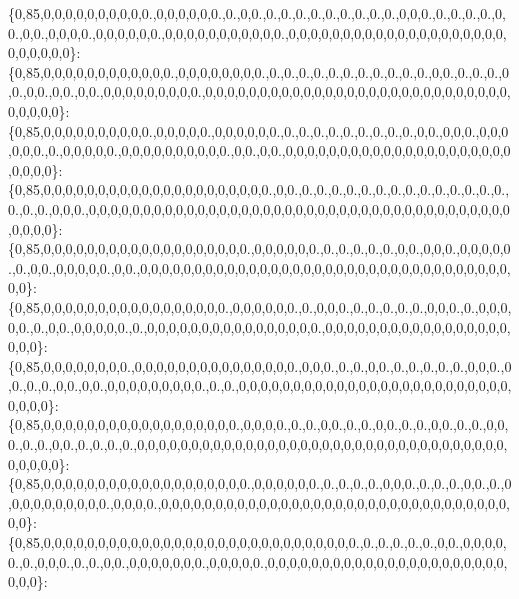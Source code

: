 \{0,85,0,0,0,0,0,0,0,0,0,0.,0,0,0,0,0,0.,0.,0,0.,0.,0.,0.,0.,0.,0.,0.,0.,0.,0,0,0.,0.,0.,0.,0.,0,0.,0,0.,0,0,0,0.,0,0,0,0,0,0.,0,0,0,0,0,0,0,0,0,0,0.,0,0,0,0,0,0,0,0,0,0,0,0,0,0,0,0,0,0,0,0,0,0,0,0,0,0\}\+: \{0,85,0,0,0,0,0,0,0,0,0,0,0,0.,0,0,0,0,0,0,0,0.,0.,0.,0.,0.,0.,0.,0.,0.,0.,0.,0.,0,0.,0.,0.,0.,0,0.,0,0.,0,0.,0,0.,0,0,0,0,0,0,0,0,0.,0,0,0,0,0,0,0,0,0,0,0,0,0,0,0,0,0,0,0,0,0,0,0,0,0,0,0,0,0,0,0,0,0\}\+: \{0,85,0,0,0,0,0,0,0,0,0,0.,0,0,0,0,0.,0,0,0,0,0,0.,0.,0.,0.,0.,0.,0.,0.,0.,0.,0,0.,0,0,0.,0,0,0,0,0,0.,0.,0,0,0,0,0.,0,0,0,0,0,0,0,0,0,0.,0,0.,0,0.,0,0,0,0,0,0,0,0,0,0,0,0,0,0,0,0,0,0,0,0,0,0,0,0,0\}\+: \{0,85,0,0,0,0,0,0,0,0,0,0,0,0,0,0,0,0,0,0,0,0,0.,0,0.,0.,0.,0.,0.,0.,0.,0.,0.,0.,0.,0.,0.,0.,0.,0.,0.,0.,0,0,0.,0,0,0,0,0,0,0,0,0,0,0,0,0,0,0,0,0,0,0,0,0,0,0,0,0,0,0,0,0,0,0,0,0,0,0,0,0,0,0,0,0,0,0\}\+: \{0,85,0,0,0,0,0,0,0,0,0,0,0,0,0,0,0,0,0,0,0.,0,0,0,0,0,0.,0.,0.,0.,0.,0.,0,0.,0,0,0.,0,0,0,0,0.,0.,0,0.,0,0,0,0,0.,0,0.,0,0,0,0,0,0,0,0,0,0,0,0,0,0,0,0,0,0,0,0,0,0,0,0,0,0,0,0,0,0,0,0,0,0,0,0\}\+: \{0,85,0,0,0,0,0,0,0,0,0,0,0,0,0,0,0,0,0.,0,0,0,0,0,0.,0.,0,0,0.,0.,0.,0.,0.,0.,0,0,0.,0.,0,0,0,0,0.,0.,0,0.,0,0,0,0,0.,0.,0,0,0,0,0,0,0,0,0,0,0,0,0,0,0,0.,0,0,0,0,0,0,0,0,0,0,0,0,0,0,0,0,0,0,0,0\}\+: \{0,85,0,0,0,0,0,0,0,0.,0,0,0,0,0,0,0,0,0,0,0,0,0,0,0.,0,0,0.,0.,0.,0,0.,0.,0.,0.,0.,0.,0,0,0.,0,0.,0.,0.,0,0.,0,0.,0,0,0,0,0,0,0,0,0.,0.,0.,0,0,0,0,0,0,0,0,0,0,0,0,0,0,0,0,0,0,0,0,0,0,0,0,0,0,0,0,0\}\+: \{0,85,0,0,0,0,0,0,0,0,0,0,0,0,0,0,0,0,0,0.,0,0,0,0.,0.,0.,0,0.,0.,0.,0,0.,0.,0.,0,0.,0.,0.,0,0,0.,0.,0.,0,0.,0.,0.,0.,0.,0,0,0,0,0,0,0,0,0,0,0,0,0,0,0,0,0,0,0,0,0,0,0,0,0,0,0,0,0,0,0,0,0,0,0,0,0,0,0\}\+: \{0,85,0,0,0,0,0,0,0,0,0,0,0,0,0,0,0,0,0,0,0.,0,0,0,0,0,0.,0.,0.,0.,0.,0,0,0.,0.,0.,0.,0,0.,0.,0,0,0,0,0,0,0,0,0,0.,0,0,0,0.,0,0,0,0,0,0,0,0,0,0,0,0,0,0,0,0,0,0,0,0,0,0,0,0,0,0,0,0,0,0,0,0,0,0\}\+: \{0,85,0,0,0,0,0,0,0,0,0,0,0,0,0,0,0,0,0,0,0,0,0,0,0,0,0,0,0,0,0.,0.,0.,0.,0.,0.,0,0.,0,0,0,0,0.,0.,0,0,0.,0.,0.,0,0.,0,0,0,0,0,0,0.,0,0,0,0,0.,0,0,0,0,0,0,0,0,0,0,0,0,0,0,0,0,0,0,0,0,0,0,0,0,0\}\+: 